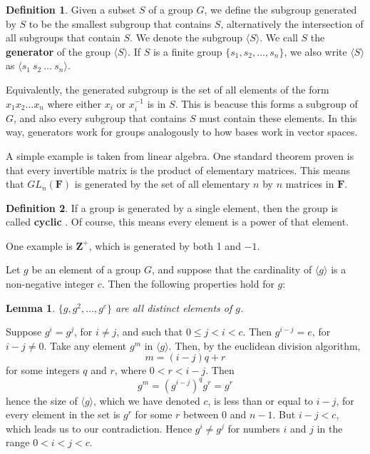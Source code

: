 \documentclass[12pt]{amsbook}
\makeatletter
\theoremstyle{plain}
\newtheorem{lemma}[theorem]{Lemma}
\theoremstyle{definition}
\newtheorem{definition}{Definition}
\renewenvironment{proof}[1][\proofname]{\par
  \pushQED{\qed}%
  \normalfont \topsep6\p@\@plus6\p@\relax
  \list{}{\leftmargin=0em
          \rightmargin=\leftmargin
          \settowidth{\itemindent}{\itshape#1}%
          \labelwidth=\itemindent}

  \item[\hskip\labelsep
        \itshape
    #1\@addpunct{.}]\ignorespaces
}{%
  \popQED\endlist\@endpefalse
}
\makeatother
\begin{document}
\begin{definition}
    Given a subset $S$ of a group $G$, we define the subgroup generated  by $S$ to be the smallest subgroup that contains $S$, alternatively the intersection of all subgroups that contain $S$. We denote the subgroup $\langle S \rangle$. We call $S$ the {\bf generator} of the group $\langle S \rangle$. If $S$ is a finite group $\{ s_1, s_2, \dots, s_n \}$, we also write $\langle S \rangle$ as $\langle s_1\ s_2\ \dots\ s_n \rangle$.
\end{definition}

Equivalently, the generated subgroup is the set of all elements of the form $x_1 x_2 \dots x_n$ where either $x_i$ or $x_i^{-1}$ is in $S$. This is beacuse this forms a subgroup of $G$, and also every subgroup that contains $S$ must contain these elements. In this way, generators work for groups analogously to how bases work in vector spaces.

A simple example is taken from linear algebra. One standard theorem proven is that every invertible matrix is the product of elementary matrices. This means that $GL_n(\mathbf{F})$ is generated by the set of all elementary $n$ by $n$ matrices in $\mathbf{F}$.

\begin{definition}
    If a group is generated by a single element, then the group is called {\bf cyclic} . Of course, this means every element is a power of that element.
\end{definition}

One example is $\mathbf{Z}^+$, which is generated by both 1 and $-1$.

Let $g$ be an element of a group $G$, and suppose that the cardinality of $\langle g \rangle$ is a non-negative integer $c$. Then the following properties hold for $g$:

\begin{lemma} $\{ g, g^2, \dots, g^c \}$ are all distinct elements of $g$. \end{lemma}
\begin{proof}
    Suppose $g^i = g^j$, for $i \neq j$, and such that $0 \leq j < i < c$. Then $g^{i - j} = e$, for $i - j \neq 0$. Take any element $g^m$ in $\langle g \rangle$. Then, by the euclidean division algorithm,
    \[ m = (i - j)q + r \]
    for some integers $q$ and $r$, where $0 < r < i - j$. Then
    \[ g^m = (g^{i - j})^q g^r = g^r \]
    hence the size of $\langle g \rangle$, which we have denoted $c$, is less than or equal to $i - j$, for every element in the set is $g^r$ for some $r$ between 0 and $n-1$. But $i - j < c$, which leads us to our contradiction. Hence $g^i \neq g^j$ for numbers $i$ and $j$ in the range $0 < i < j < c$.
\end{proof}
\end{document}
